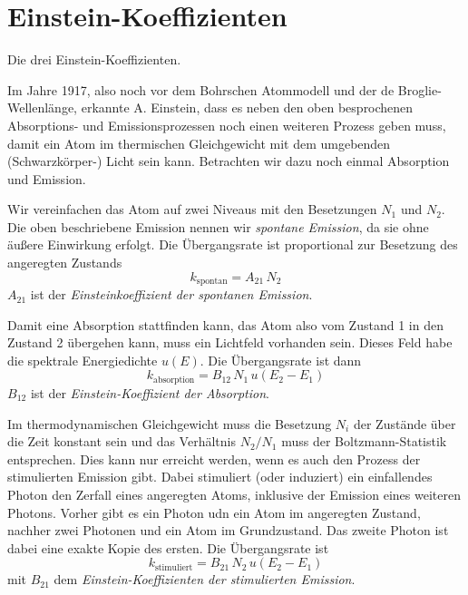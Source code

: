 \section{Einstein-Koeffizienten}


\begin{marginfigure}
    \caption{Die drei Einstein-Koeffizienten.}
\end{marginfigure}

Im Jahre 1917, also noch vor dem Bohrschen Atommodell und der de Broglie-Wellenlänge, erkannte A. Einstein, dass es neben den oben besprochenen Absorptions- und Emissionsprozessen noch einen weiteren Prozess geben muss, damit ein Atom im thermischen Gleichgewicht mit dem umgebenden (Schwarzkörper-) Licht sein kann. Betrachten wir dazu noch einmal Absorption und Emission.

Wir vereinfachen das Atom auf zwei Niveaus mit den Besetzungen $N_1$ und $N_2$. Die oben beschriebene Emission nennen wir \emph{spontane Emission}, da sie ohne äußere Einwirkung erfolgt. Die Übergangsrate ist proportional zur Besetzung des angeregten Zustands
\begin{equation}
    k_\text{spontan} = A_{21} \, N_2 \label{eq:7_k_spontan}
\end{equation}
$A_{21}$ ist der \emph{Einsteinkoeffizient der spontanen Emission}.


Damit eine Absorption stattfinden kann, das Atom also vom Zustand 1 in den Zustand 2 übergehen kann, muss ein Lichtfeld vorhanden sein. Dieses Feld habe die spektrale Energiedichte $u(E)$. Die Übergangsrate ist dann
\begin{equation}
    k_\text{absorption} = B_{12} \, N_1 \, u(E_2 - E_1) \label{eq:7_k_abs}
\end{equation}
$B_{12}$ ist der \emph{Einstein-Koeffizient der Absorption}.

Im thermodynamischen Gleichgewicht muss die Besetzung $N_i$ der Zustände über die Zeit konstant sein und das Verhältnis $N_2 / N_1$ muss der Boltzmann-Statistik entsprechen. Dies kann nur erreicht werden, wenn es auch den  Prozess der stimulierten Emission gibt. Dabei stimuliert  (oder induziert) ein einfallendes Photon den Zerfall eines angeregten Atoms, inklusive der Emission eines weiteren Photons. Vorher gibt es ein Photon udn ein Atom im angeregten Zustand, nachher  zwei Photonen und ein Atom im Grundzustand. Das zweite Photon ist dabei eine exakte Kopie des ersten. Die Übergangsrate ist 
\begin{equation}
    k_\text{stimuliert} = B_{21} \, N_2 \, u(E_2 - E_1) \label{eq:7_k_stim}
\end{equation}
mit $B_{21}$ dem  \emph{Einstein-Koeffizienten der stimulierten Emission}.


